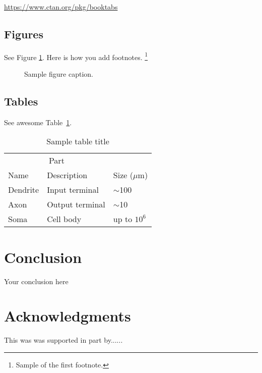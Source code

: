 \documentclass{article}
\begin{document}
\begin{center}
  \url{https://www.ctan.org/pkg/booktabs}
\end{center}


\subsection{Figures} 
See Figure \ref{fig:fig1}. Here is how you add footnotes. \footnote{Sample of the first footnote.}

\begin{figure}
  \centering
  \fbox{\rule[-.5cm]{4cm}{4cm} \rule[-.5cm]{4cm}{0cm}}
  \caption{Sample figure caption.}
  \label{fig:fig1}
\end{figure}

\subsection{Tables}
See awesome Table~\ref{tab:table}.

\begin{table}
 \caption{Sample table title}
  \centering
  \begin{tabular}{lll}
    \toprule
    \multicolumn{2}{c}{Part}                   \\
    \cmidrule(r){1-2}
    Name     & Description     & Size ($\mu$m) \\
    \midrule
    Dendrite & Input terminal  & $\sim$100     \\
    Axon     & Output terminal & $\sim$10      \\
    Soma     & Cell body       & up to $10^6$  \\
    \bottomrule
  \end{tabular}
  \label{tab:table}
\end{table}

\section{Conclusion}
Your conclusion here

\section*{Acknowledgments}
This was was supported in part by......

  
  
\end{document}
